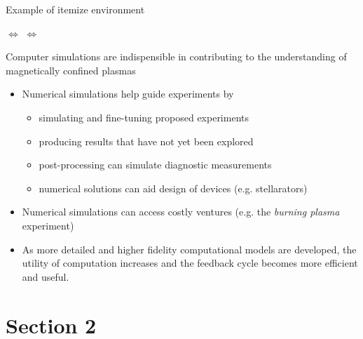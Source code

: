 \documentclass{beamer}
\begin{document}
\begin{frame}{Example of itemize environment}
\begin{center}  $\Leftrightarrow$  $\Leftrightarrow$ \end{center}
Computer simulations are indispensible in contributing to the understanding of magnetically confined plasmas
\begin{itemize}
\item Numerical simulations help guide experiments by
  \begin{itemize}
    \item simulating and fine-tuning proposed experiments %
    \item producing results that have not yet been explored
    \item post-processing can simulate diagnostic measurements
    \item numerical solutions can aid design of devices (e.g. stellarators)
    \end{itemize}
\item Numerical simulations can access costly ventures (e.g. the \emph{burning plasma} experiment)
\item As more detailed and higher fidelity computational models are developed, the utility of computation increases and the feedback cycle becomes more efficient and useful.
\end{itemize}
\end{frame}


\section{Section 2}
\end{document}
